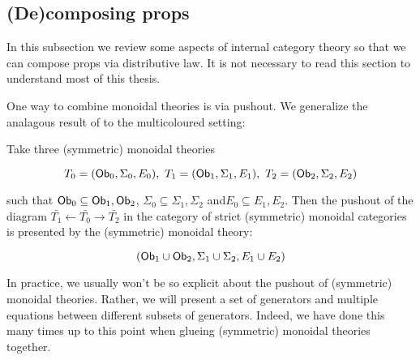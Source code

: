 

\subsection{(De)composing props}
\label{subsec:internal}
%
%
%
%
%
%
%



In this subsection we review some aspects of internal category theory so that we can compose props via distributive law.  It is not necessary to read this section to understand most of this thesis.






One way to combine monoidal theories is via pushout.  We generalize the analagous result of \cite[Proposition 2.51]{ih} to the multicoloured setting:

\begin{lemma}
Take three (symmetric) monoidal theories

$$T_0=({\sf Ob}_0,\Sigma_0 ,E_0 ), \ T_1=({\sf Ob}_1,\Sigma_1 ,E_1 ), \ T_2=({\sf Ob}_2,\Sigma_2 ,E_2 )$$

such that ${\sf Ob}_0 \subseteq {\sf Ob}_1,{\sf Ob}_2$, $\Sigma_0 \subseteq \Sigma_1,\Sigma_2$ and$E_0 \subseteq E_1,E_2$.
Then the pushout of the diagram $\bar{T_1} \leftarrow \bar{T_0} \rightarrow \bar{T_2}$  in the category of strict (symmetric) monoidal categories is presented by the (symmetric) monoidal theory:

$$
( {\sf Ob}_1 \cup {\sf Ob}_2, \Sigma_1 \cup \Sigma_2, E_1 \cup E_2)
$$

\end{lemma}

In practice, we usually won't be so explicit about the pushout of (symmetric) monoidal theories.  Rather, we will present a set of generators and multiple equations between different subsets of generators.  Indeed, we have done this many times up to this point when glueing (symmetric) monoidal theories together.  



